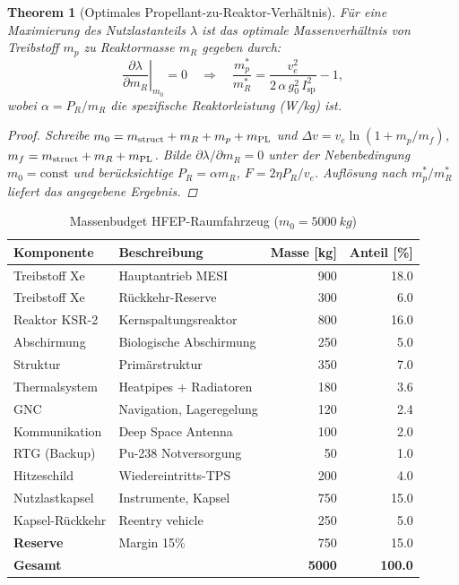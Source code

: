 ﻿\documentclass[a4paper,12pt,twoside]{article}
\theoremstyle{plain}
\newtheorem{theorem}{Theorem}[section]
\theoremstyle{definition}
\theoremstyle{remark}
\newcommand{\Isp}{I_{\mathrm{sp}}}
\newcommand{\ve}{v_e}
\newcommand{\Dv}{\Delta v}
\newcommand{\mzero}{m_0}
\newcommand{\gzero}{g_0}
\begin{document}
	\begin{theorem}[Optimales Propellant-zu-Reaktor-Verhältnis]
		\label{thm:opt_mass}
		Für eine Maximierung des Nutzlastanteils $\lambda$ ist das optimale
		Massenverhältnis von Treibstoff $m_p$ zu Reaktormasse $m_R$ gegeben durch:
		\begin{equation}
			\left.\frac{\partial\lambda}{\partial m_R}\right|_{m_0} = 0
			\quad\Longrightarrow\quad
			\frac{m_p^*}{m_R^*} = \frac{\ve^2}{2\,\alpha\,\gzero^2\,\Isp^2} - 1,
		\end{equation}
		wobei $\alpha = P_R / m_R$ die spezifische Reaktorleistung (W/kg) ist.
		\begin{proof}
			Schreibe $m_0 = m_{\rm struct} + m_R + m_p + m_{\rm PL}$ und
			$\Dv = \ve\ln(1 + m_p/m_f)$, $m_f = m_{\rm struct} + m_R + m_{\rm PL}$.
			Bilde $\partial\lambda/\partial m_R = 0$ unter der Nebenbedingung
			$m_0 = \text{const}$ und berücksichtige $P_R = \alpha m_R$,
			$F = 2\eta P_R/\ve$. Auflösung nach $m_p^*/m_R^*$ liefert das angegebene Ergebnis.
			\qedhere
		\end{proof}
	\end{theorem}
	
	\begin{table}[h]
		\centering
		\caption{Massenbudget HFEP-Raumfahrzeug ($\mzero = \SI{5000}{kg}$)}
		\label{tab:mass_budget}
		\renewcommand{\arraystretch}{1.3}
		\begin{tabular}{llrr}
			\toprule
			\textbf{Komponente} & \textbf{Beschreibung} & \textbf{Masse [kg]} & \textbf{Anteil [\%]}\\
			\midrule
			Treibstoff Xe  & Hauptantrieb MESI      & 900  & 18.0 \\
			Treibstoff Xe  & Rückkehr-Reserve       & 300  & 6.0  \\
			Reaktor KSR-2  & Kernspaltungsreaktor   & 800  & 16.0 \\
			Abschirmung    & Biologische Abschirmung & 250 & 5.0  \\
			Struktur       & Primärstruktur         & 350  & 7.0  \\
			Thermalsystem  & Heatpipes + Radiatoren & 180  & 3.6  \\
			GNC            & Navigation, Lageregelung& 120 & 2.4  \\
			Kommunikation  & Deep Space Antenna     & 100  & 2.0  \\
			RTG (Backup)   & Pu-238 Notversorgung   & 50   & 1.0  \\
			Hitzeschild    & Wiedereintritts-TPS    & 200  & 4.0  \\
			Nutzlastkapsel & Instrumente, Kapsel    & 750  & 15.0 \\
			Kapsel-Rückkehr& Reentry vehicle        & 250  & 5.0  \\
			\textbf{Reserve}& Margin 15\%           & 750  & 15.0 \\
			\midrule
			\textbf{Gesamt} &                       & \textbf{5000} & \textbf{100.0}\\
			\bottomrule
		\end{tabular}
	\end{table}
	
\end{document}
